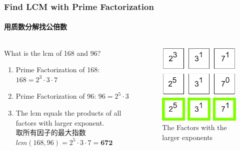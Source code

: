 \documentclass[
	11pt, %
	handout,
]{beamer}
\begin{document}
\begin{frame}	
	\frametitle{Find LCM with Prime Factorization}
	\framesubtitle{用质数分解找公倍数}
	\begin{columns}[t] %
			\begin{column}{0.45\textwidth} %
				What is the lcm of 168 and 96?
			 \begin{enumerate}
			 	\item Prime Factorization of 168: $168=2^3 \cdot 3 \cdot 7$
			 	\item Prime Factorization of 96: $96=2^5 \cdot 3$
			 	\item The lcm equals the products of all factors with larger exponent.\\ 取所有因子的最大指数 \\ $lcm(168, 96) = 2^5 \cdot 3 \cdot 7= \textbf{672}$
			 	\end{enumerate}
			\end{column}

			\begin{column}{0.5\textwidth} %
			  \begin{figure}
			    \includegraphics[width=0.8\linewidth]{168_96_LCM.png}
			    \caption{The Factors with the larger exponents}
		    \end{figure}
			\end{column}
	\end{columns}
\end{frame}
\end{document}
